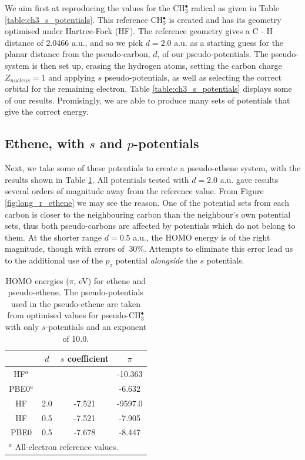 \documentclass[journal=jctcce,manuscript=article]{achemso}
\begin{document}
We aim first at reproducing the values for the CH\(^{\bullet}_{3}\) radical as given in Table \ref{table:ch3_s_potentials}. 
This reference CH\(^{\bullet}_{3}\) is created and has its geometry optimised under Hartree-Fock (HF). The reference geometry gives a C - H distance of 2.0466 a.u., and so we pick \(d = 2.0\) a.u. as a starting guess for the planar distance from the pseudo-carbon, \(d\), of our pseudo-potentials. The pseudo-system is then set up, erasing the hydrogen atoms, setting the carbon charge \(Z_{nucleus} = 1\) and applying \(s\) pseudo-potentials, as well as selecting the correct orbital for the remaining electron. Table \ref{table:ch3_s_potentials} displays some of our results. Promisingly, we are able to produce many sets of potentials that give the correct energy.

\subsection{Ethene, with \(s\) and \(p\)-potentials}

Next, we take some of these potentials to create a pseudo-ethene system, with the results shown in Table \ref{table:ethene_s_pseudo}. All potentials tested with \(d = 2.0\) a.u. gave results several orders of magnitude away from the reference value. From Figure \ref{fig:long_r_ethene} we may see the reason. One of the potential sets from each carbon is closer to the neighbouring carbon than the neighbour's own potential sets, thus both pseudo-carbons are affected by potentials which do not belong to them. At the shorter range \(d = 0.5\) a.u., the HOMO energy is of the right magnitude, though with errors of \(~ 30\%\). Attempts to eliminate this error lead us to the additional use of the \(p_{z}\) potential \textit{alongside} the \(s\) potentials.

\begin{table}[ht]
\caption{HOMO energies ($\pi$, eV) for ethene and pseudo-ethene. The pseudo-potentials used in the pseudo-ethene are taken from optimised values for 
pseudo-CH\(^{\bullet}_{3}\) with only \(s\)-potentials and an exponent of 10.0.}
\begin{tabular}{c c c c}
\hline
& $d$ & \(s\) coefficient & \( \pi \)  \\
\hline
HF$^a$   &     &        & -10.363 \\
PBE0$^a$ &     &        & -6.632 \\
HF       & 2.0 & -7.521 & -9597.0 \\
HF       & 0.5 & -7.521  & -7.905 \\
PBE0     & 0.5 &-7.678  & -8.447 \\
\hline
\multicolumn{4}{l}{$^a$ All-electron reference values.}\\
\end{tabular}
\label{table:ethene_s_pseudo}
\end{table}
\end{document}
